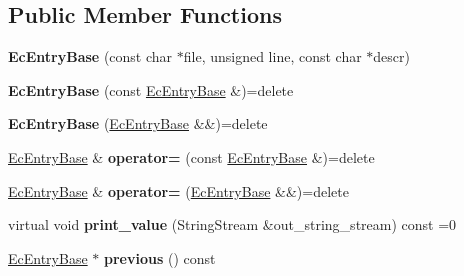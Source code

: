 \subsection*{Public Member Functions}
\begin{DoxyCompactItemize}
\item 
\mbox{\label{classloguru_1_1_ec_entry_base_a00be5a6ad88cdb61c3d35115ed583af7}} 
{\bfseries Ec\+Entry\+Base} (const char $\ast$file, unsigned line, const char $\ast$descr)
\item 
\mbox{\label{classloguru_1_1_ec_entry_base_aa900637d961a054b7e0db2d0dfb76bd6}} 
{\bfseries Ec\+Entry\+Base} (const \mbox{\hyperlink{classloguru_1_1_ec_entry_base}{Ec\+Entry\+Base}} \&)=delete
\item 
\mbox{\label{classloguru_1_1_ec_entry_base_a49ecc1cd5c08ddd8358c7784a52d3940}} 
{\bfseries Ec\+Entry\+Base} (\mbox{\hyperlink{classloguru_1_1_ec_entry_base}{Ec\+Entry\+Base}} \&\&)=delete
\item 
\mbox{\label{classloguru_1_1_ec_entry_base_a883b04cbd1cd2a45066099fd5dd6d3da}} 
\mbox{\hyperlink{classloguru_1_1_ec_entry_base}{Ec\+Entry\+Base}} \& {\bfseries operator=} (const \mbox{\hyperlink{classloguru_1_1_ec_entry_base}{Ec\+Entry\+Base}} \&)=delete
\item 
\mbox{\label{classloguru_1_1_ec_entry_base_a326c8204d74626080ec25662100559b1}} 
\mbox{\hyperlink{classloguru_1_1_ec_entry_base}{Ec\+Entry\+Base}} \& {\bfseries operator=} (\mbox{\hyperlink{classloguru_1_1_ec_entry_base}{Ec\+Entry\+Base}} \&\&)=delete
\item 
\mbox{\label{classloguru_1_1_ec_entry_base_a886f464f9b4415c01360f1889e0513eb}} 
virtual void {\bfseries print\+\_\+value} (String\+Stream \&out\+\_\+string\+\_\+stream) const =0
\item 
\mbox{\label{classloguru_1_1_ec_entry_base_a6a718612865ebf161d27c9a2c8c28f24}} 
\mbox{\hyperlink{classloguru_1_1_ec_entry_base}{Ec\+Entry\+Base}} $\ast$ {\bfseries previous} () const
\end{DoxyCompactItemize}
